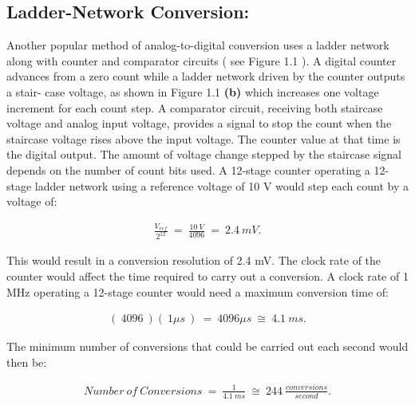 \pagebreak

\subsection{Ladder-Network Conversion:}

Another popular method of analog-to-digital conversion uses a ladder network along with counter and comparator circuits ( see Figure 1.1 ). A digital counter advances from a zero count while a ladder network driven by the counter outputs a stair- case voltage, as shown in Figure 1.1 {\bfseries (b)}  which increases one voltage increment for each count step. A comparator circuit, receiving both staircase voltage and analog input voltage, provides a signal to stop the count when the staircase voltage rises above the input voltage. The counter value at that time is the digital output. The amount of voltage change stepped by the staircase signal depends on the number of count bits used. A 12-stage counter operating a 12-stage ladder network using a reference voltage of 10 V would step each count by a voltage of: \hfill \break

\begin{ceqn}
\begin{align*}
\frac{V_{ref}}{2^{12}}\ =\ \frac{10\ V}{4096} \ =\ 2.4\ mV.
\end{align*}
\end{ceqn} \hfill \break

This would result in a conversion resolution of 2.4 mV. The clock rate of the counter would affect the time required to carry out a conversion. A clock rate of 1 MHz operating a 12-stage counter would need a maximum conversion time of: \hfill \break

\begin{ceqn}
\begin{align*}
(\ 4096\ )(\ 1 \mu s\ )\ =\ 4096 \mu s\ \cong\ 4.1\ ms.
\end{align*}
\end{ceqn} \hfill \break

The minimum number of conversions that could be carried out each second would then be: \hfill \break

\begin{ceqn}
\begin{align*}
Number\ of\ Conversions\ =\ \frac{1}{4.1\ ms}\ \cong\ 244\ \frac{conversions}{second}.
\end{align*}
\end{ceqn} \hfill \break

